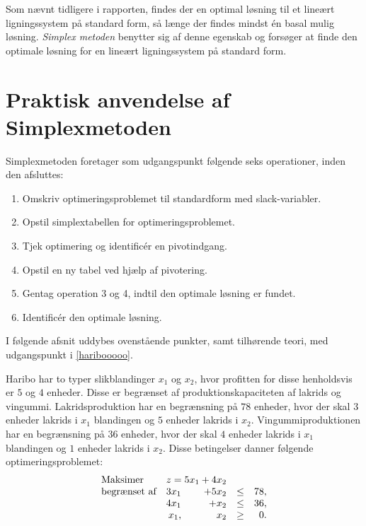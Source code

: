 Som nævnt tidligere i rapporten, findes der en optimal løsning til et lineært ligningssystem på standard form, så længe der findes mindst én basal mulig løsning. 
\textit{Simplex metoden} benytter sig af denne egenskab og forsøger at finde den optimale løsning for en lineært ligningssystem på standard form.
%
%
\section{Praktisk anvendelse af Simplexmetoden}
Simplexmetoden foretager som udgangspunkt følgende seks operationer, inden den afsluttes: 
%
\begin{col}{}{}
%
\begin{enumerate}
\item Omskriv optimeringsproblemet til standardform med slack-variabler.  %
\item Opstil simplextabellen for optimeringsproblemet.					 %
\item Tjek optimering og identificér en pivotindgang.					 %
\item Opstil en ny tabel ved hjælp af pivotering. 						 %
\item Gentag operation 3 og 4, indtil den optimale løsning er fundet. 					 %
\item Identificér den optimale løsning.									 %
\end{enumerate}
%
\end{col}
\noindent
%
I følgende afsnit uddybes ovenstående punkter, samt tilhørende teori, med udgangspunkt i \ref{haribooooo}.
%
\\
%
\begin{eks}
\label{haribooooo}
Haribo har to typer slikblandinger $x_1$ og $x_2$, hvor profitten for disse henholdsvis er $5$ og $4$ enheder.
Disse er begrænset af produktionskapaciteten af lakrids og vingummi.
Lakridsproduktion har en begrænsning på $78$ enheder, hvor der skal $3$ enheder lakrids i $x_1$ blandingen og $5$ enheder lakrids i $x_2$.
Vingummiproduktionen har en begrænsning på $36$ enheder, hvor der skal $4$ enheder lakrids i $x_1$ blandingen og $1$ enheder lakrids i $x_2$. 
%
Disse betingelser danner følgende optimeringsproblemet:
%
\begin{align*}
\begin{array}{lrrlr} 
\text{Maksimer}		&	\multicolumn{2}{c}{z=5x_1+4x_2}  &\\
\text{begrænset af}	&3x_1& +5x_2			&\leq 	&78,\\
					&4x_1& + x_2				&\leq	& 36,\\
					&x_1,& x_2				&\geq	& 0.
\end{array}
\end{align*}
%
\end{eks}

